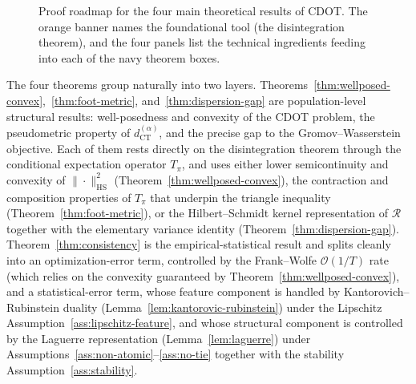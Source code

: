 \documentclass{article}
\theoremstyle{plain}
\theoremstyle{definition}
\theoremstyle{remark}
\begin{document}
\begin{figure}[t]
	\caption{Proof roadmap for the four main theoretical results of CDOT. The orange banner names the foundational tool (the disintegration theorem), and the four panels list the technical ingredients feeding into each of the navy theorem boxes.}
	\label{fig:proof-roadmap}
\end{figure}

The four theorems group naturally into two layers. Theorems~\ref{thm:wellposed-convex},~\ref{thm:foot-metric}, and~\ref{thm:dispersion-gap} are population-level structural results: well-posedness and convexity of the CDOT problem, the pseudometric property of $d_{\mathrm{CT}}^{(\alpha)}$, and the precise gap to the Gromov--Wasserstein objective. Each of them rests directly on the disintegration theorem through the conditional expectation operator $T_\pi$, and uses either lower semicontinuity and convexity of $\|\cdot\|_{\mathrm{HS}}^2$ (Theorem~\ref{thm:wellposed-convex}), the contraction and composition properties of $T_\pi$ that underpin the triangle inequality (Theorem~\ref{thm:foot-metric}), or the Hilbert--Schmidt kernel representation of $\mathcal{R}$ together with the elementary variance identity (Theorem~\ref{thm:dispersion-gap}). Theorem~\ref{thm:consistency} is the empirical-statistical result and splits cleanly into an optimization-error term, controlled by the Frank--Wolfe $\mathcal{O}(1/T)$ rate (which relies on the convexity guaranteed by Theorem~\ref{thm:wellposed-convex}), and a statistical-error term, whose feature component is handled by Kantorovich--Rubinstein duality (Lemma~\ref{lem:kantorovic-rubinstein}) under the Lipschitz Assumption~\ref{ass:lipschitz-feature}, and whose structural component is controlled by the Laguerre representation (Lemma~\ref{lem:laguerre}) under Assumptions~\ref{ass:non-atomic}--\ref{ass:no-tie} together with the stability Assumption~\ref{ass:stability}.
\end{document}
